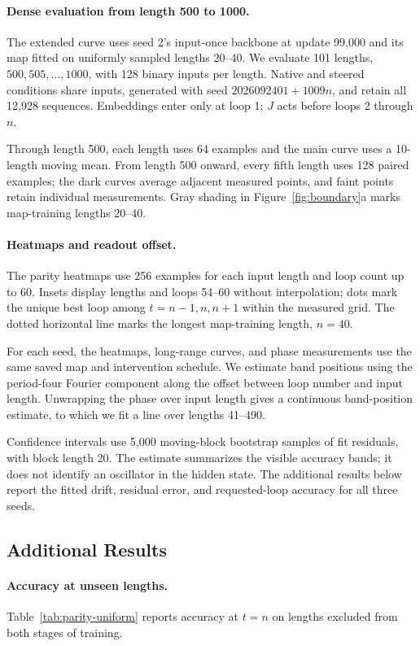 \documentclass{article}
\begin{document}
\paragraph{Dense evaluation from length 500 to 1000.}
The extended curve uses seed 2's input-once backbone at update 99,000 and its map fitted on uniformly sampled lengths 20--40. We evaluate 101 lengths, $500,505,\ldots,1000$, with 128 binary inputs per length. Native and steered conditions share inputs, generated with seed $2026092401+1009n$, and retain all 12,928 sequences. Embeddings enter only at loop 1; $J$ acts before loops 2 through $n$.

Through length 500, each length uses 64 examples and the main curve uses a 10-length moving mean. From length 500 onward, every fifth length uses 128 paired examples; the dark curves average adjacent measured points, and faint points retain individual measurements. Gray shading in Figure~\ref{fig:boundary}a marks map-training lengths 20--40.

\paragraph{Heatmaps and readout offset.}
The parity heatmaps use 256 examples for each input length and loop count up to 60. Insets display lengths and loops 54--60 without interpolation; dots mark the unique best loop among $t=n-1,n,n+1$ within the measured grid. The dotted horizontal line marks the longest map-training length, $n=40$.

For each seed, the heatmaps, long-range curves, and phase measurements use the same saved map and intervention schedule. We estimate band positions using the period-four Fourier component along the offset between loop number and input length. Unwrapping the phase over input length gives a continuous band-position estimate, to which we fit a line over lengths 41--490.

Confidence intervals use 5,000 moving-block bootstrap samples of fit residuals, with block length 20. The estimate summarizes the visible accuracy bands; it does not identify an oscillator in the hidden state. The additional results below report the fitted drift, residual error, and requested-loop accuracy for all three seeds.

\subsection{Additional Results}
\label{app:parity-results}
\paragraph{Accuracy at unseen lengths.}
Table~\ref{tab:parity-uniform} reports accuracy at $t=n$ on lengths excluded from both stages of training.
\end{document}
